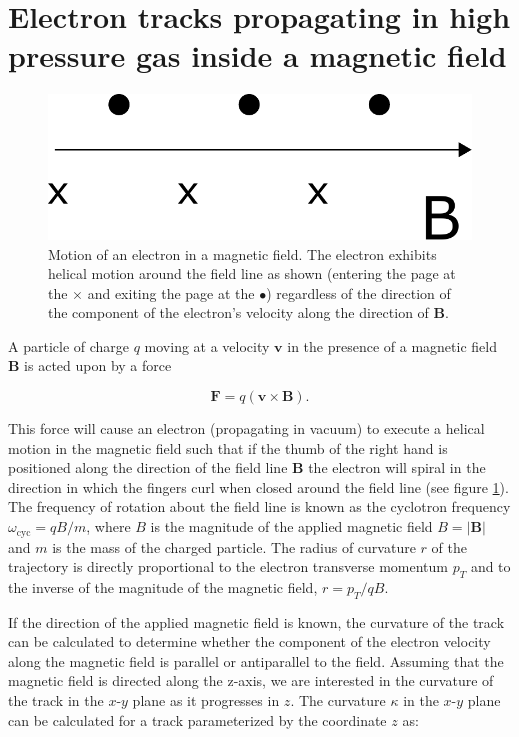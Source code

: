 \documentclass{JINST}
\begin{document}
\section{Electron tracks propagating in high pressure gas inside a magnetic field}\label{sec.magmotion}

\begin{figure}[!htb]
	\centering
	\includegraphics[scale=0.6]{fig/bfield_motion.pdf}
	\caption{\label{fig_bfieldmotion}Motion of an electron in a magnetic field.  The electron exhibits helical motion around the field line as shown (entering the page at the $\times$ and exiting the page at the $\bullet$) regardless of the direction of the component of the electron's velocity along the direction of $\mathbf{B}$.}
\end{figure}

A particle of charge $q$ moving at a velocity $\mathbf{v}$ in the presence of a magnetic field $\mathbf{B}$ is acted upon by a force

\begin{equation}\label{eqn_Bmotion}
\mathbf{F} = q(\mathbf{v} \times \mathbf{B}).
\end{equation}

\noindent This force will cause an electron (propagating in vacuum) to execute a helical motion in the magnetic field such that if the thumb of the right hand is positioned along the direction of the field line $\mathbf{B}$ the electron will spiral in the direction in which the fingers curl when closed around the field line (see figure \ref{fig_bfieldmotion}).  The frequency of rotation about the field line is known as the cyclotron frequency $\omega_{\mathrm{cyc}} = qB/m$, where $B$ is the magnitude of the applied magnetic field $B = |\mathbf{B}|$ and $m$ is the mass of the charged particle. The radius of curvature $r$ of the trajectory is directly proportional to the electron transverse momentum $p_{T}$ and to the inverse of the magnitude of the magnetic field, $r = p_{T}/qB$.

If the direction of the applied magnetic field is known, the curvature of the track can be calculated to determine whether the component of the electron velocity along the magnetic field is parallel or antiparallel to the field.  Assuming that the magnetic field is directed along the z-axis, we are interested in the curvature of the track in the $x$-$y$ plane as it progresses in $z$.  The curvature $\kappa$ in the $x$-$y$ plane can be calculated for a track parameterized by the coordinate $z$ as:
\end{document}
